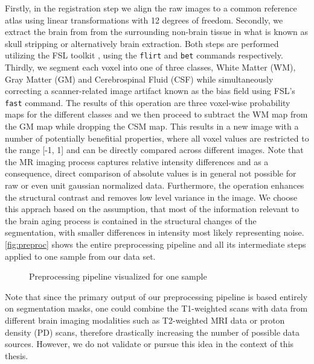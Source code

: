 Firstly, in the registration step we align the raw images to a common reference atlas using linear transformations with 12 degrees of freedom. Secondly, we extract the brain from from the surrounding non-brain tissue in what is known as skull stripping or alternatively brain extraction. Both steps are performed utilizing the FSL toolkit \cite{jenkinson2012fsl}, using the \texttt{flirt} \cite{jenkinson2001global} \cite{jenkinson2002improved} and \texttt{bet} \cite{smith2002fast} \cite{jenkinson2005bet2} commands respectively. Thirdly, we segment each voxel into one of three classes, White Matter (WM), Gray Matter (GM) and Cerebrospinal Fluid (CSF) while simultaneously correcting a scanner-related image artifact known as the bias field using FSL's \texttt{fast} \cite{zhang2001segmentation} command. The results of this operation are three voxel-wise probability maps for the different classes and we then proceed to subtract the WM map from the GM map while dropping the CSM map. This results in a new image with a number of potentially benefitial properties, where all voxel values are restricted to the range [-1, 1] and can be directly compared across different images. Note that the MR imaging process captures relative intensity differences and as a consequence, direct comparison of absolute values is in general not possible for raw or even unit gaussian normalized data. Furthermore, the operation enhances the structural contrast and removes low level variance in the image. We choose this apprach based on the assumption, that most of the information relevant to the brain aging process is contained in the structural changes of the segmentation, with smaller differences in intensity most likely representing noise. \autoref{fig:preproc} shows the entire preprocessing pipeline and all its intermediate steps applied to one sample from our data set.


\begin{figure}
	\noindent\makebox[1.1\textwidth]{
		\centering
		
	}
	\caption{Preprocessing pipeline visualized for one sample}
	\label{fig:preproc}
\end{figure}

Note that since the primary output of our preprocessing pipeline is based entirely on segmentation masks, one could combine the T1-weighted scans with data from different brain imaging modalities such as T2-weighted MRI data or proton density (PD) scans, therefore drastically increasing the number of possible data sources. However, we do not validate or pursue this idea in the context of this thesis.


